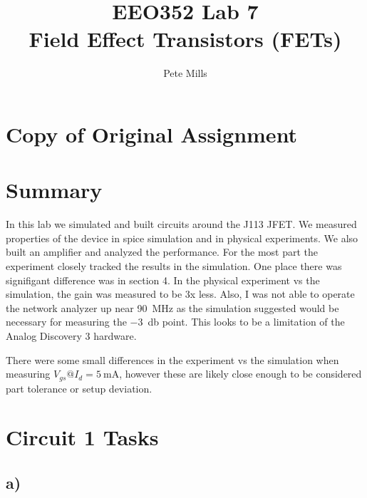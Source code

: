 \documentclass{article}
\begin{document}
	
	
	\title{EEO352 Lab 7\\Field Effect Transistors (FETs)}
	\author{Pete Mills}
	
	\maketitle
	
	\section*{Copy of Original Assignment}
	
	
	
	
	\section*{Summary}
	
	In this lab we simulated and built circuits around the J113 JFET. We measured properties of the device in spice simulation and in physical experiments. We also built an amplifier and analyzed the performance. For the most part the experiment closely tracked the results in the simulation. One place there was signifigant difference was in section 4. In the physical experiment vs the simulation, the gain was measured to be 3x less. Also, I was not able to operate the network analyzer up near \SI{90}{\mega\hertz} as the simulation suggested would be necessary for measuring the \SI{-3}{\decibel} point. This looks to be a limitation of the Analog Discovery 3 hardware. 
	
	There were some small differences in the experiment vs the simulation when measuring $V_{gs} @ I_d = \SI{5}{\mA}$, however these are likely close enough to be considered part tolerance or setup deviation.
	

	\section{Circuit 1 Tasks}
	
	\subsection*{a)}
\end{document}
